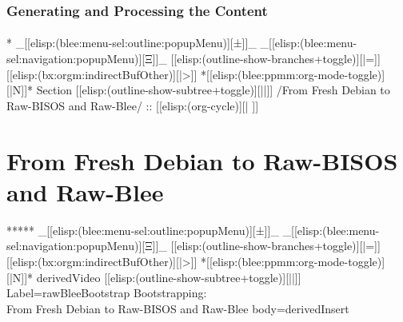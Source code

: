 \begin{whenOrg}
\begin{verblatex}

\begin{frame}[fragile,label=part_processingContent]
    \frametitle{Generating and Processing the Content}
    \framesubtitle{}

    \tableofcontents

\end{frame}
\end{verblatex}


\begin{whenOrg}
*  _[[elisp:(blee:menu-sel:outline:popupMenu)][±]]_ _[[elisp:(blee:menu-sel:navigation:popupMenu)][Ξ]]_ [[elisp:(outline-show-branches+toggle)][|=]] [[elisp:(bx:orgm:indirectBufOther)][|>]] *[[elisp:(blee:ppmm:org-mode-toggle)][|N]]*  Section    [[elisp:(outline-show-subtree+toggle)][||]]   /From Fresh Debian to Raw-BISOS and Raw-Blee/ ::  [[elisp:(org-cycle)][| ]]
\end{whenOrg}

\section{From Fresh Debian to Raw-BISOS and Raw-Blee}


\begin{whenOrg}
*****  _[[elisp:(blee:menu-sel:outline:popupMenu)][±]]_ _[[elisp:(blee:menu-sel:navigation:popupMenu)][Ξ]]_ [[elisp:(outline-show-branches+toggle)][|=]] [[elisp:(bx:orgm:indirectBufOther)][|>]] *[[elisp:(blee:ppmm:org-mode-toggle)][|N]]*  derivedVideo [[elisp:(outline-show-subtree+toggle)][||]] Label=rawBleeBootstrap Bootstrapping:\\ From Fresh Debian to Raw-BISOS and Raw-Blee body=derivedInsert
\end{whenOrg}


\end{whenOrg}
